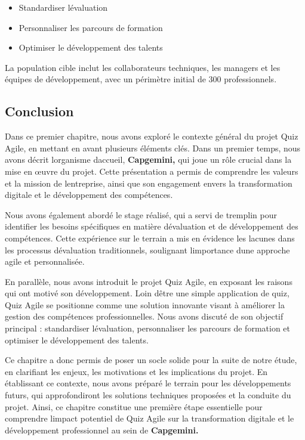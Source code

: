 \documentclass[12pt,a4paper,twoside]{report}
\begin{document}
\begin{itemize}
\item
  Standardiser l\textquotesingle évaluation
\item
  Personnaliser les parcours de formation
\item
  Optimiser le développement des talents
\end{itemize}

La population cible inclut les collaborateurs techniques, les managers
et les équipes de développement, avec un périmètre initial de 300
professionnels.

\hypertarget{conclusion}{%
\subsection{Conclusion}\label{conclusion}}

Dans ce premier chapitre, nous avons exploré le contexte général du
projet Quiz Agile, en mettant en avant plusieurs éléments clés. Dans un
premier temps, nous avons décrit l\textquotesingle organisme
d\textquotesingle accueil, \textbf{Capgemini,} qui joue un rôle crucial
dans la mise en œuvre du projet. Cette présentation a permis de
comprendre les valeurs et la mission de l\textquotesingle entreprise,
ainsi que son engagement envers la transformation digitale et le
développement des compétences.

Nous avons également abordé le stage réalisé, qui a servi de tremplin
pour identifier les besoins spécifiques en matière
d\textquotesingle évaluation et de développement des compétences. Cette
expérience sur le terrain a mis en évidence les lacunes dans les
processus d\textquotesingle évaluation traditionnels, soulignant
l\textquotesingle importance d\textquotesingle une approche agile et
personnalisée.

En parallèle, nous avons introduit le projet Quiz Agile, en exposant les
raisons qui ont motivé son développement. Loin d\textquotesingle être
une simple application de quiz, Quiz Agile se positionne comme une
solution innovante visant à améliorer la gestion des compétences
professionnelles. Nous avons discuté de son objectif principal :
standardiser l\textquotesingle évaluation, personnaliser les parcours de
formation et optimiser le développement des talents.

Ce chapitre a donc permis de poser un socle solide pour la suite de
notre étude, en clarifiant les enjeux, les motivations et les
implications du projet. En établissant ce contexte, nous avons préparé
le terrain pour les développements futurs, qui approfondiront les
solutions techniques proposées et la conduite du projet. Ainsi, ce
chapitre constitue une première étape essentielle pour comprendre
l\textquotesingle impact potentiel de Quiz Agile sur la transformation
digitale et le développement professionnel au sein de
\textbf{Capgemini.}
\end{document}
